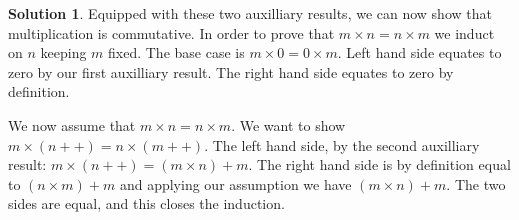 \documentclass[a4paper, twocolumn]{report}
\theoremstyle{definition}
\theoremstyle{solution}
\newtheorem*{sltn}{Solution}
\newcommand{\dplus}{{+}{+}} %
\begin{document}
\begin{sltn}
  Equipped with these two auxilliary results, we can now show that
  multiplication is commutative.  In order to prove that $m \times n = n \times
  m$ we induct on $n$ keeping $m$ fixed.  The base case is $ m \times 0 = 0
  \times m$. Left hand side equates to zero by our first auxilliary result. The
  right hand side equates to zero by definition.

  We now assume that $m \times n = n \times m$. We want to show
  $m\times(n\dplus) = n \times (m\dplus)$.  The left hand side, by the second
  auxilliary result: $m \times (n\dplus) = (m\times n) + m$.  The right hand
  side is by definition equal to $(n \times m) + m$ and applying our assumption
  we have $(m \times n) + m$. The two sides are equal, and this closes the
  induction.
  
  \end{sltn}
\todos
\end{document}
